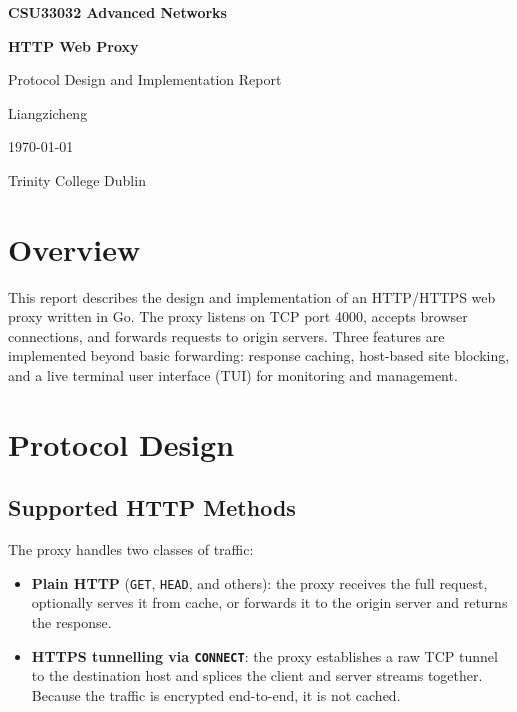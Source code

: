 \documentclass[11pt,a4paper]{article}
\begin{document}
\begin{titlepage}
  \centering
  \vspace*{3cm}
  {\Large\bfseries CSU33032 Advanced Networks\par}
  \vspace{0.5cm}
  {\huge\bfseries HTTP Web Proxy\par}
  \vspace{0.5cm}
  {\large Protocol Design and Implementation Report\par}
  \vspace{2cm}
  {\large Liangzicheng\par}
  \vspace{0.5cm}
  {\large\today\par}
  \vfill
  {\small Trinity College Dublin\par}
\end{titlepage}

\tableofcontents
\newpage

\section{Overview}

This report describes the design and implementation of an HTTP/HTTPS web proxy
written in Go. The proxy listens on TCP port 4000, accepts browser connections,
and forwards requests to origin servers. Three features are implemented beyond
basic forwarding: response caching, host-based site blocking, and a live
terminal user interface (TUI) for monitoring and management.

\section{Protocol Design}

\subsection{Supported HTTP Methods}

The proxy handles two classes of traffic:

\begin{itemize}
  \item \textbf{Plain HTTP} (\texttt{GET}, \texttt{HEAD}, and others): the proxy
    receives the full request, optionally serves it from cache, or forwards it
    to the origin server and returns the response.
  \item \textbf{HTTPS tunnelling via \texttt{CONNECT}}: the proxy establishes a
    raw TCP tunnel to the destination host and splices the client and server
    streams together. Because the traffic is encrypted end-to-end, it is not
    cached.
\end{itemize}
\end{document}
